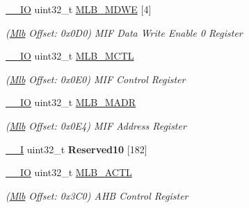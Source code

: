 \begin{DoxyCompactItemize}
\mbox{\label{structMlb_afba159e838688a34c6421a13452bf9b3}} 
\mbox{\hyperlink{core__cm7_8h_aec43007d9998a0a0e01faede4133d6be}{\+\_\+\+\_\+\+IO}} uint32\+\_\+t \mbox{\hyperlink{structMlb_afba159e838688a34c6421a13452bf9b3}{M\+L\+B\+\_\+\+M\+D\+WE}} \mbox{[}4\mbox{]}
\begin{DoxyCompactList}\small\item\em (\mbox{\hyperlink{structMlb}{Mlb}} Offset\+: 0x0\+D0) M\+IF Data Write Enable 0 Register \end{DoxyCompactList}\item 
\mbox{\label{structMlb_a77a1bf22b8594e8283f72a4e0ebf6384}} 
\mbox{\hyperlink{core__cm7_8h_aec43007d9998a0a0e01faede4133d6be}{\+\_\+\+\_\+\+IO}} uint32\+\_\+t \mbox{\hyperlink{structMlb_a77a1bf22b8594e8283f72a4e0ebf6384}{M\+L\+B\+\_\+\+M\+C\+TL}}
\begin{DoxyCompactList}\small\item\em (\mbox{\hyperlink{structMlb}{Mlb}} Offset\+: 0x0\+E0) M\+IF Control Register \end{DoxyCompactList}\item 
\mbox{\label{structMlb_a199be2cd08e72397437848f0d75baa6c}} 
\mbox{\hyperlink{core__cm7_8h_aec43007d9998a0a0e01faede4133d6be}{\+\_\+\+\_\+\+IO}} uint32\+\_\+t \mbox{\hyperlink{structMlb_a199be2cd08e72397437848f0d75baa6c}{M\+L\+B\+\_\+\+M\+A\+DR}}
\begin{DoxyCompactList}\small\item\em (\mbox{\hyperlink{structMlb}{Mlb}} Offset\+: 0x0\+E4) M\+IF Address Register \end{DoxyCompactList}\item 
\mbox{\label{structMlb_ad3dd9aed4ce5d9b5c9b9b893d60c1172}} 
\mbox{\hyperlink{core__cm7_8h_af63697ed9952cc71e1225efe205f6cd3}{\+\_\+\+\_\+I}} uint32\+\_\+t {\bfseries Reserved10} \mbox{[}182\mbox{]}
\item 
\mbox{\label{structMlb_aa1e935132503f4359f153b02a008e950}} 
\mbox{\hyperlink{core__cm7_8h_aec43007d9998a0a0e01faede4133d6be}{\+\_\+\+\_\+\+IO}} uint32\+\_\+t \mbox{\hyperlink{structMlb_aa1e935132503f4359f153b02a008e950}{M\+L\+B\+\_\+\+A\+C\+TL}}
\begin{DoxyCompactList}\small\item\em (\mbox{\hyperlink{structMlb}{Mlb}} Offset\+: 0x3\+C0) A\+HB Control Register \end{DoxyCompactList}\item 

\end{DoxyCompactItemize}
